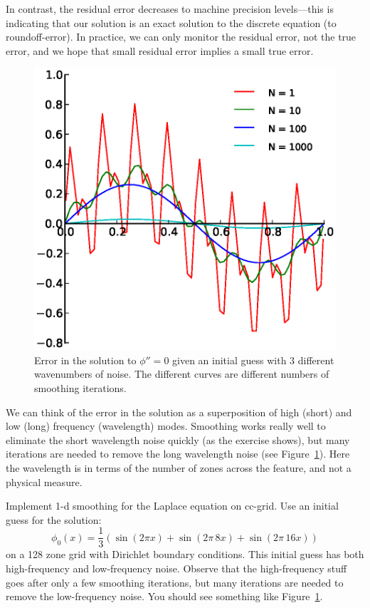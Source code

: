 In contrast, the residual error decreases to machine precision
levels---this is indicating that our solution is an exact solution to
the discrete equation (to roundoff-error).
In practice, we can only monitor the residual error, not the true
error, and we hope that small residual error implies a small true
error.

\begin{figure}[t]
\centering
\includegraphics[width=0.8\linewidth]{smooth_error}
\caption[Smoothing of different wavenumbers]{\label{fig:smooth} Error
  in the solution to $\phi'' = 0$ given an initial guess with 3
  different wavenumbers of noise.  The different curves are different
  numbers of smoothing iterations.}
\end{figure}

We can think of the error in the solution as a superposition of high
(short) and low (long) frequency (wavelength) modes.  Smoothing works
really well to eliminate the short wavelength noise quickly (as the
exercise shows), but many iterations are needed to remove the long
wavelength noise (see Figure~\ref{fig:smooth}).  Here the wavelength
is in terms of the number of zones across the feature, and not a
physical measure.  

\begin{exercise}
{Implement 1-d smoothing for the Laplace equation on
  cc-grid.  Use an initial guess for the solution:
  \begin{equation}
  \phi_0(x) = \frac{1}{3} ( \sin(2\pi x) + \sin(2\pi \, 8 x) + \sin(2\pi \, 16 x) )
  \end{equation}
  on a 128 zone grid with Dirichlet boundary conditions.  This initial
  guess has both high-frequency and low-frequency noise.  Observe that
  the high-frequency stuff goes after only a few smoothing iterations,
  but many iterations are needed to remove the low-frequency noise.
  You should see something like Figure~\ref{fig:smooth}.
}
\end{exercise}


